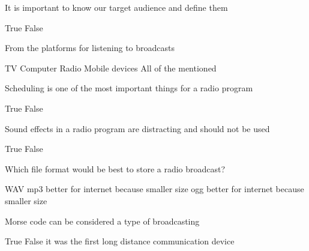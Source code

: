 \documentclass[theme=sleek, randomorder, hidesidemenu]{webquiz}
\begin{document}
\begin{question}
  It is important to know our target audience and define them
  \begin{choice}
    \correct True
    \incorrect False

  \end{choice}

\end{question}

\begin{question}
  From the platforms for listening to broadcasts
  \begin{choice}
    \incorrect TV
    \incorrect Computer
    \incorrect Radio
    \incorrect Mobile devices
    \correct All of the mentioned

  \end{choice}

\end{question}

\begin{question}
  Scheduling is one of the most important things for a radio program
  \begin{choice}
    \correct True
    \incorrect False

  \end{choice}

\end{question}

\begin{question}
  Sound effects in a radio program are distracting and should not be used
  \begin{choice}
    \incorrect True
    \correct False

  \end{choice}

\end{question}

\begin{question}
  Which file format would be best to store a radio broadcast?
  \begin{choice}
    \correct WAV
    \incorrect mp3
    \feedback better for internet because smaller size
    \incorrect ogg
    \feedback better for internet because smaller size
  \end{choice}

\end{question}

\begin{question}
  Morse code can be considered a type of broadcasting
  \begin{choice}
    \correct True
    \incorrect False
    \feedback it was the first long distance communication device
  \end{choice}

\end{question}
\end{document}
